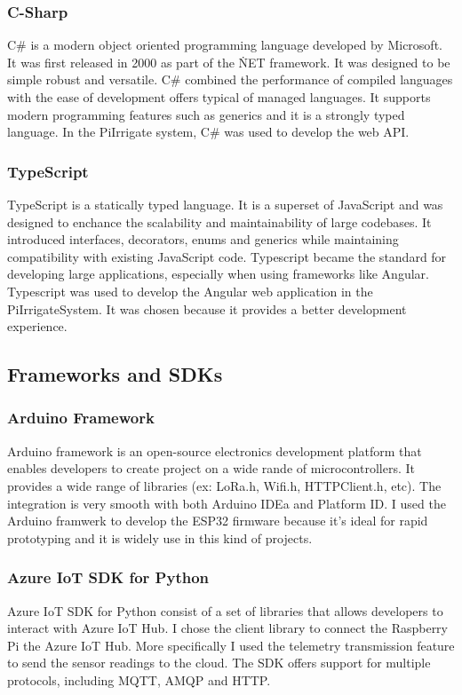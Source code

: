 \subsubsection{C-Sharp}
C\# is a modern object oriented programming language developed by Microsoft. It was first released in 2000 as part of the \.NET framework.
It was designed to be simple robust and versatile. C\# combined the performance of compiled languages with the ease of development offers
typical of managed languages. It supports modern programming features such as generics and it is a strongly typed language\cite{dotnet_official}\cite{microsoft_csharp}.
In the PiIrrigate system, C\# was used to develop the web API.

\subsubsection{TypeScript}
TypeScript is a statically typed language. It is a superset of JavaScript and was designed to enchance the scalability and maintainability of large codebases.
It introduced interfaces, decorators, enums and generics while maintaining compatibility with existing JavaScript code. Typescript became
the standard for developing large applications, especially when using frameworks like Angular. Typescript was used to develop the Angular
web application in the PiIrrigateSystem. It was chosen because it provides a better development experience.

\subsection{Frameworks and SDKs}
\subsubsection{Arduino Framework}
Arduino framework is an open-source electronics development platform that enables developers to create project on a wide rande of microcontrollers.
It provides a wide range of libraries (ex: LoRa.h, Wifi.h, HTTPClient.h, etc). The integration is very smooth with both Arduino IDEa and Platform ID.
I used the Arduino framwerk to develop the ESP32 firmware because it's ideal for rapid prototyping and it is widely use in this kind of projects\cite{arduino_core}.

\subsubsection{Azure IoT SDK for Python}
Azure IoT SDK for Python consist of a set of libraries that allows developers to interact with Azure IoT Hub. I chose the client
library to connect the Raspberry Pi the Azure IoT Hub. More specifically I used the telemetry transmission feature to send the sensor readings 
to the cloud. The SDK offers support for multiple protocols, including MQTT, AMQP and HTTP\cite{azure_iot_hub_docs}\cite{azure_iot_sdk_python}.

